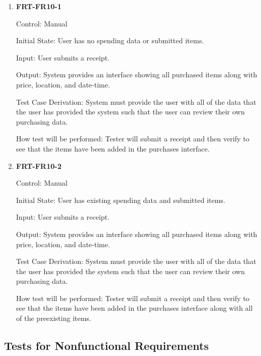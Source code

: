 \documentclass[12pt, titlepage]{article}
\begin{document}
\begin{enumerate}

\item{\textbf{FRT-FR10-1}}

Control: Manual
          
Initial State: User has no spending data or submitted items.

Input: User submits a receipt.
          
Output: System provides an interface showing all purchased items along with price, location, and date-time.

Test Case Derivation: System must provide the user with all of the data that the user has provided the system such that the user can review their own purchasing data.
          
How test will be performed: Tester will submit a receipt and then verify to see that the items have been added in the purchases interface.

\item{\textbf{FRT-FR10-2}}

Control: Manual
          
Initial State: User has existing spending data and submitted items.

Input: User submits a receipt.
          
Output: System provides an interface showing all purchased items along with price, location, and date-time.

Test Case Derivation: System must provide the user with all of the data that the user has provided the system such that the user can review their own purchasing data.
          
How test will be performed: Tester will submit a receipt and then verify to see that the items have been added in the purchases interface along with all of the preexisting items.

\end{enumerate}

\subsection{Tests for Nonfunctional Requirements}

\end{document}
